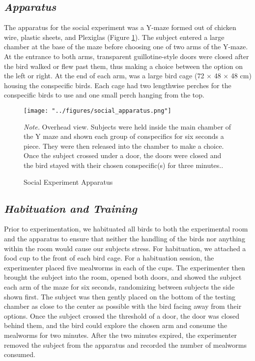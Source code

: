 \documentclass[
  ,pub,floatsintext]{apa6}
\begin{document}
\hypertarget{apparatus}{%
\subsection{\texorpdfstring{\emph{Apparatus}}{Apparatus}}\label{apparatus}}

The apparatus for the social experiment was a Y-maze formed out of chicken wire, plastic sheets, and Plexiglas (Figure \ref{fig:socialapp}). The subject entered a large chamber at the base of the maze before choosing one of two arms of the Y-maze. At the entrance to both arms, transparent guillotine-style doors were closed after the bird walked or flew past them, thus making a choice between the option on the left or right. At the end of each arm, was a large bird cage (72 \(\times\) 48 \(\times\) 48 cm) housing the conspecific birds. Each cage had two lengthwise perches for the conspecific birds to use and one small perch hanging from the top.

\begin{figure}[H]
\caption{\newline Social Experiment Apparatus \label{fig:socialapp}}
\begin{center}
\texttt{[image: "../figures/social\_apparatus.png"]}
\end{center}

\textit{Note.} Overhead view. Subjects were held inside the main chamber of the Y maze and shown each group of conspecifics for six seconds a piece. They were then released into the chamber to make a choice. Once the subject crossed under a door, the doors were closed and the bird stayed with their chosen conspecific(s) for three minutes..
\end{figure}

\hypertarget{habituation-and-training-1}{%
\subsection{\texorpdfstring{\emph{Habituation and Training}}{Habituation and Training}}\label{habituation-and-training-1}}

Prior to experimentation, we habituated all birds to both the experimental room and the apparatus to ensure that neither the handling of the birds nor anything within the room would cause our subjects stress. For habituation, we attached a food cup to the front of each bird cage. For a habituation session, the experimenter placed five mealworms in each of the cups. The experimenter then brought the subject into the room, opened both doors, and showed the subject each arm of the maze for six seconds, randomizing between subjects the side shown first. The subject was then gently placed on the bottom of the testing chamber as close to the center as possible with the bird facing away from their options. Once the subject crossed the threshold of a door, the door was closed behind them, and the bird could explore the chosen arm and consume the mealworms for two minutes. After the two minutes expired, the experimenter removed the subject from the apparatus and recorded the number of mealworms consumed.
\end{document}
